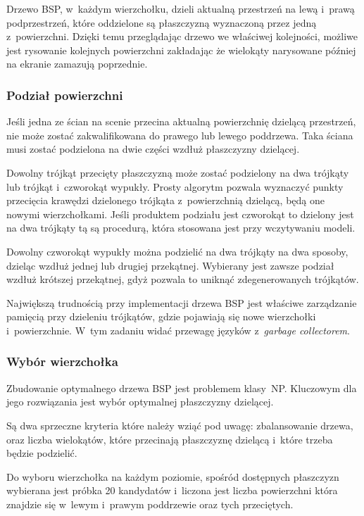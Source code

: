 \documentclass[12pt,a4paper]{article}
\begin{document}
Drzewo BSP, w~każdym wierzchołku, dzieli aktualną przestrzeń
na lewą i~prawą podprzestrzeń, które oddzielone są płaszczyzną wyznaczoną
przez jedną z~powierzchni. Dzięki temu przeglądając drzewo we właściwej
kolejności, możliwe jest rysowanie kolejnych powierzchni zakładając
że wielokąty narysowane później na ekranie zamazują poprzednie.

\subsubsection{Podział powierzchni}
Jeśli jedna ze ścian na scenie przecina aktualną powierzchnię
dzielącą przestrzeń, nie może zostać zakwalifikowana do prawego
lub lewego poddrzewa.  Taka ściana musi zostać podzielona
na dwie części wzdłuż płaszczyzny dzielącej.

Dowolny trójkąt przecięty płaszczyzną może zostać podzielony na
dwa trójkąty lub trójkąt i~czworokąt wypukły.
Prosty algorytm pozwala wyznaczyć punkty przecięcia krawędzi
dzielonego trójkąta z~powierzchnią dzielącą, będą one nowymi
wierzchołkami.
Jeśli produktem podziału jest czworokąt to dzielony jest
na dwa trójkąty tą są procedurą, która stosowana jest przy
wczytywaniu modeli.

Dowolny czworokąt wypukły można podzielić na dwa trójkąty
na dwa sposoby, dzieląc wzdłuż jednej lub drugiej przekątnej.
Wybierany jest zawsze podział wzdłuż krótszej przekątnej,
gdyż pozwala to uniknąć zdegenerowanych trójkątów.

Największą trudnością przy implementacji drzewa BSP
jest właściwe zarządzanie pamięcią przy dzieleniu trójkątów,
gdzie pojawiają się nowe wierzchołki i~powierzchnie.
W~tym zadaniu widać przewagę języków z~\textsl{garbage collectorem}.

\subsubsection{Wybór wierzchołka}
Zbudowanie optymalnego drzewa BSP jest problemem klasy~NP.
Kluczowym dla jego rozwiązania jest wybór optymalnej
płaszczyzny dzielącej.

Są dwa sprzeczne kryteria które należy wziąć pod uwagę:
zbalansowanie drzewa, oraz liczba wielokątów, które przecinają
płaszczyznę dzielącą i~które trzeba będzie podzielić.

Do wyboru wierzchołka na każdym poziomie, spośród dostępnych
płaszczyzn wybierana jest próbka 20 kandydatów i~liczona
jest liczba powierzchni która znajdzie się w~lewym
i~prawym poddrzewie oraz tych przeciętych.
\end{document}
